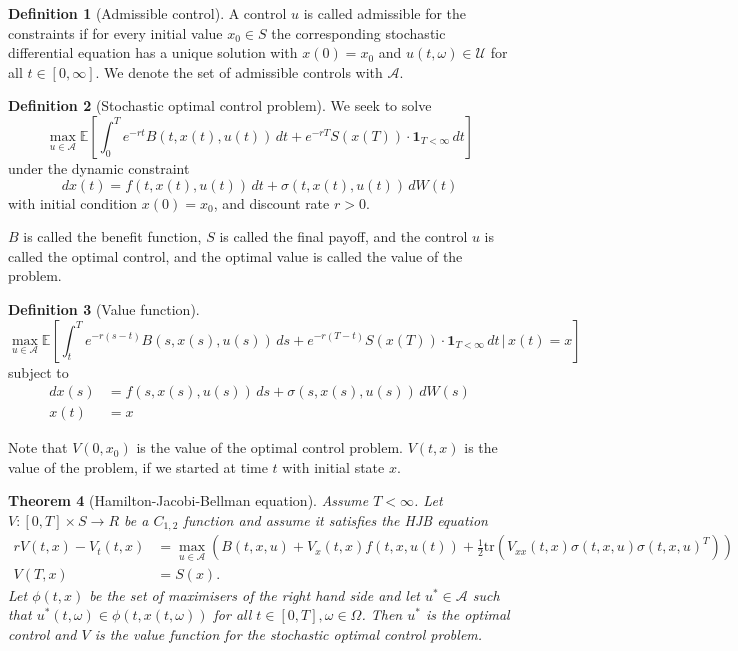 \documentclass[10pt, oneside, reqno]{amsart}
\theoremstyle{plain}%
\newtheorem{thm}{Theorem}[section]
\numberwithin{equation}{section}
\theoremstyle{definition}
\newtheorem{defn}[thm]{Definition}
\theoremstyle{remark}
\newcommand{\given}{ \, | \,}
\newcommand{\E}{\mathbb{E}}
\begin{document}
\begin{defn}[Admissible control]
	A control $u$ is called admissible for the constraints if for every initial value $x_0 \in S$ the corresponding stochastic differential equation has a unique solution with $x(0) = x_0$ and $u(t, \omega) \in \mathcal U$ for all $t \in [0, \infty]$.  We denote the set of admissible controls with $\mathcal A$.  
\end{defn}

\begin{defn}[Stochastic optimal control problem]
	We seek to solve \[
		\max_{u \in \mathcal A} \E \left[ \int_0^T e^{-rt} B(t, x(t), u(t)) \, dt + e^{-rT}S(x(T)) \cdot \mathbf{1}_{T < \infty} \, dt\right]
	\] under the dynamic constraint \[
		dx(t) = f(t, x(t), u(t)) \, dt + \sigma(t, x(t), u(t)) \, dW(t)
	\] with initial condition $x(0) = x_0$, and discount rate $r > 0$.  
	
	$B$ is called the benefit function, $S$ is called the final payoff, and the control $u$ is called the optimal control, and the optimal value is called the value of the problem.
\end{defn}

\begin{defn}[Value function] \[
	\max_{u \in \mathcal A} \E \left[ \int_t^T e^{-r(s-t)} B(s, x(s), u(s)) \, ds + e^{-r(T-t)}S(x(T)) \cdot \mathbf{1}_{T < \infty} \, dt \given x(t) = x \right]
	\] subject to \begin{align*}
		dx(s) &= f(s, x(s), u(s)) \, ds + \sigma(s, x(s), u(s)) \, dW(s) \\
		x(t) &= x
	\end{align*}  
	
	Note that $V(0, x_0)$ is the value of the optimal control problem. $V(t, x)$ is the value of the problem, if we started at time $t$ with initial state $x$.  
\end{defn}

\begin{thm}[Hamilton-Jacobi-Bellman equation]
	Assume $T < \infty$.  Let $V: [0, T] \times S \rightarrow R$ be a $C_{1, 2}$ function and assume it satisfies the HJB equation \begin{align*}
		rV(t, x) - V_t(t, x) &= \max_{u \in \mathcal A} \left(B(t, x, u) + V_x(t, x) f(t, x, u(t)) + \frac{1}{2} \text{tr}(V_{xx}(t, x) \sigma(t, x, u) \sigma(t, x, u)^T) \right) \\
		V(T, x) &= S(x).
	\end{align*}  Let $\phi(t, x)$ be the set of maximisers of the right hand side and let $u^* \in \mathcal A$ such that $u^*(t, \omega) \in \phi(t, x(t, \omega))$ for all $t \in [ 0, T], \omega \in \Omega$. Then $u^*$ is the optimal control and $V$ is the value function for the stochastic optimal control problem.  
\end{thm}
\end{document}

